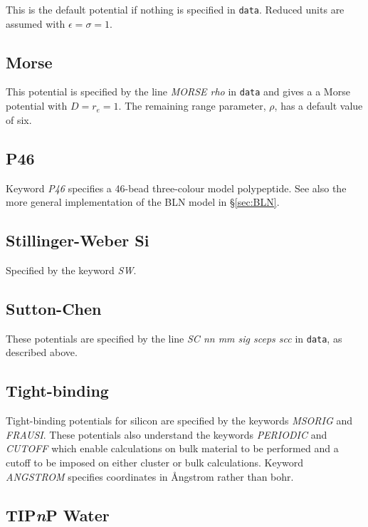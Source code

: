 \documentclass[12pt,a4paper,dvips]{article}
\begin{document}
This is the default potential if nothing is specified in {\tt data}. Reduced units are
assumed with $\epsilon=\sigma=1$.

\subsection{Morse}

This potential is specified by the line {\it MORSE rho\/} in {\tt data} and gives a
a Morse potential with $D=r_e=1$. 
The remaining range parameter,\cite{braierbw90,doyewb95,doyew96a} $\rho$, has a default 
value of six.

\subsection{P46}

Keyword {\it P46\/} specifies a 46-bead three-colour model polypeptide. 
See also the more general implementation of the BLN model in \S \ref{sec:BLN}.

\subsection{Stillinger-Weber Si}

Specified by the keyword {\it SW\/}.

\subsection{Sutton-Chen}

These potentials\cite{suttonc90} are specified by the line {\it SC nn mm sig sceps scc\/} in {\tt data},
as described above. 

\subsection{Tight-binding}

Tight-binding potentials for silicon are specified by the keywords {\it MSORIG\/} 
and {\it FRAUSI\/}.
These potentials also understand the 
keywords {\it PERIODIC\/} and {\it CUTOFF\/} which enable calculations on bulk material
to be performed and a cutoff to be imposed on either cluster or bulk calculations.
Keyword {\it ANGSTROM\/} specifies coordinates in \AA ngstrom rather than bohr.

\subsection{TIP{\it n\/}P Water}
\end{document}
